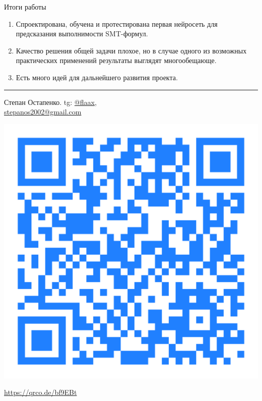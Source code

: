 \documentclass[14pt,aspectratio=169,hyperref={pdftex,unicode},xcolor=dvipsnames]{beamer}
\begin{document}
\begin{frame}{Итоги работы}

\begin{enumerate}
  \item Спроектирована, обучена и протестирована первая нейросеть для предсказания выполнимости SMT-формул.
  \item Качество решения общей задачи плохое, но в случае одного из возможных практических применений результаты выглядят многообещающе.
  \item Есть много идей для дальнейшего развития проекта.
\end{enumerate}

\vspace{2mm}\hrule

\begin{minipage}{0.5\textwidth}
\begin{center}

Степан Остапенко. tg: \href{https://t.me/flaax}{@flaax}, \\ \href{mailto:stepanos2002@gmail.com}{stepanos2002@gmail.com}

\end{center}
\end{minipage}%
\begin{minipage}{0.5\textwidth}
\begin{center}

\includegraphics[scale=0.03]{./assets/booklet-qr.pdf}

{\small \url{https://qrco.de/bf9EBt}}

\end{center}
\end{minipage}

\end{frame}
\end{document}
